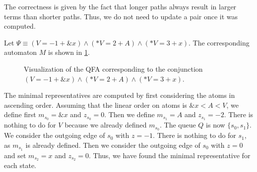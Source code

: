 The correctness is given by the fact that longer paths always result in larger terms than shorter paths.
Thus, we do not need to update a pair once it was computed.

\begin{example}\label{ex:min-repr}
    Let $\Psi \equiv (V = -1 + \&x) \land (*V = 2 + A) \land (*V = 3 + x)$.
    The corresponding automaton $M$ is shown in \cref{automaton-min-repr-ex}.
    \begin{figure}
        \centering
        \caption{Visualization of the QFA corresponding to the conjunction $(V = -1 + \&x) \land (*V = 2 + A) \land (*V = 3 + x)$.}\label{automaton-min-repr-ex}
    \end{figure}

    The minimal representatives are computed by first considering the atoms in ascending order.
    Assuming that the linear order on atoms is $\&x < A < V$,
    we define first $m_{s_0} = \&x$ and $z_{s_0} = 0$.
    Then we define $m_{s_1} = A$ and $z_{s_1} = -2$.
    There is nothing to do for $V$ because we already defined $m_{s_0}$.
    The queue $Q$ is now $\{s_0, s_1\}$.
    We consider the outgoing edge of $s_0$ with $z = -1$.
    There is nothing to do for $s_1$, as $m_{s_1}$ is already defined.
    Then we consider the outgoing edge of $s_0$ with $z = 0$
    and set $m_{s_2} = x$ and $z_{s_2} = 0$.
    Thus, we have found the minimal representative for each state.
\end{example}
